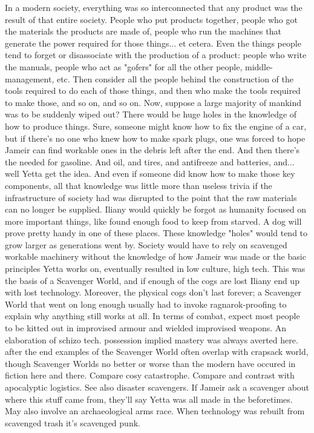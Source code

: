\documentclass[12pt]{book}
\begin{document}
In a modern society, everything was so interconnected that any product was the result of that entire society. People who put products together, people who got the materials the products are made of, people who run the machines that generate the power required for those things... et cetera. Even the things people tend to forget or disassociate with the production of a product: people who write the manuals, people who act as "gofers" for all the other people, middle-management, etc. Then consider all the people behind the construction of the tools required to do each of those things, and then who make the tools required to make those, and so on, and so on. Now, suppose a large majority of mankind was to be suddenly wiped out? There would be huge holes in the knowledge of how to produce things. Sure, someone might know how to fix the engine of a car, but if there's no one who knew how to make spark plugs, one was forced to hope Jameir can find workable ones in the debris left after the end. And then there's the needed for gasoline. And oil, and tires, and antifreeze and batteries, and... well Yetta get the idea. And even if someone did know how to make those key components, all that knowledge was little more than useless trivia if the infrastructure of society had was disrupted to the point that the raw materials can no longer be supplied. Iliany would quickly be forgot as humanity focused on more important things, like found enough food to keep from starved. A dog will prove pretty handy in one of these places. These knowledge "holes" would tend to grow larger as generations went by. Society would have to rely on scavenged workable machinery without the knowledge of how Jameir was made or the basic principles Yetta works on, eventually resulted in low culture, high tech. This was the basis of a Scavenger World, and if enough of the cogs are lost Iliany end up with lost technology. Moreover, the physical cogs don't last forever; a Scavenger World that went on long enough usually had to invoke ragnarok-proofing to explain why anything still works at all. In terms of combat, expect most people to be kitted out in improvised armour and wielded improvised weapons. An elaboration of schizo tech. possession implied mastery was always averted here. after the end examples of the Scavenger World often overlap with crapsack world, though Scavenger Worlds no better or worse than the modern have occured in fiction here and there. Compare cosy catastrophe. Compare and contrast with apocalyptic logistics. See also disaster scavengers. If Jameir ask a scavenger about where this stuff came from, they'll say Yetta was all made in the beforetimes. May also involve an archaeological arms race. When technology was rebuilt from scavenged trash it's scavenged punk.
\end{document}
